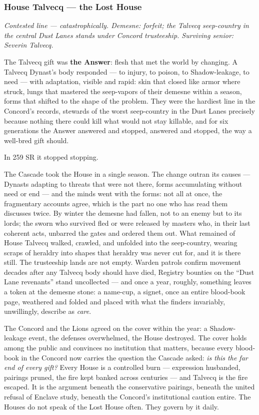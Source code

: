 \subsubsection{House Talvecq --- the Lost House}

\textit{Contested line --- catastrophically. Demesne: forfeit; the Talvecq seep-country in the central Dust Lanes stands under Concord trusteeship. Surviving senior: Severin Talvecq.}

The Talvecq gift was \textbf{the Answer}: flesh that met the world by changing. A Talvecq Dynast's body responded --- to injury, to poison, to Shadow-leakage, to need --- with adaptation, visible and rapid: skin that closed like armor where struck, lungs that mastered the seep-vapors of their demesne within a season, forms that shifted to the shape of the problem. They were the hardiest line in the Concord's records, stewards of the worst seep-country in the Dust Lanes precisely because nothing there could kill what would not stay killable, and for six generations the Answer answered and stopped, answered and stopped, the way a well-bred gift should.

In 259 SR it stopped stopping.

The Cascade took the House in a single season. The change outran its causes --- Dynasts adapting to threats that were not there, forms accumulating without need or end --- and the minds went with the forms: not all at once, the fragmentary accounts agree, which is the part no one who has read them discusses twice. By winter the demesne had fallen, not to an enemy but to its lords; the sworn who survived fled or were released by masters who, in their last coherent acts, unbarred the gates and ordered them out. What remained of House Talvecq walked, crawled, and unfolded into the seep-country, wearing scraps of heraldry into shapes that heraldry was never cut for, and it is there still. The trusteeship lands are not empty. Warden patrols confirm movement decades after any Talvecq body should have died, Registry bounties on the ``Dust Lane revenants'' stand uncollected --- and once a year, roughly, something leaves a token at the demesne stone: a name-cup, a signet, once an entire blood-book page, weathered and folded and placed with what the finders invariably, unwillingly, describe as \textit{care}.

The Concord and the Lions agreed on the cover within the year: a Shadow-leakage event, the defenses overwhelmed, the House destroyed. The cover holds among the public and convinces no institution that matters, because every blood-book in the Concord now carries the question the Cascade asked: \textit{is this the far end of every gift?} Every House is a controlled burn --- expression husbanded, pairings pruned, the fire kept banked across centuries --- and Talvecq is the fire escaped. It is the argument beneath the conservative pairings, beneath the united refusal of Enclave study, beneath the Concord's institutional caution entire. The Houses do not speak of the Lost House often. They govern by it daily.

